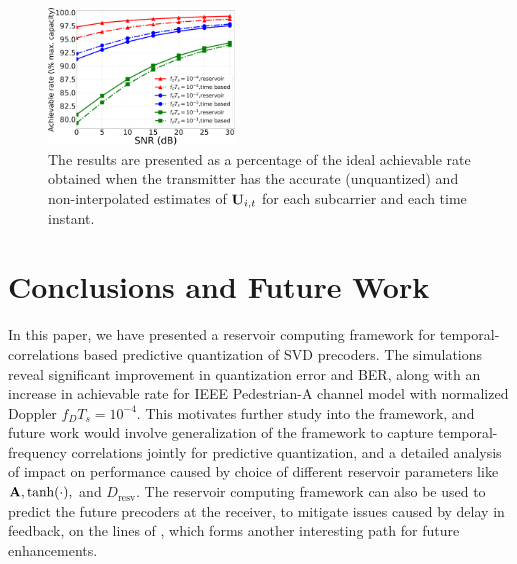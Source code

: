 \documentclass[conference]{IEEEtran}
\begin{document}
\begin{figure}[h]
\centering
\includegraphics[width=0.44\textwidth]{images/hopRate.pdf}
\caption{The results are presented as a percentage of the ideal achievable rate obtained when the transmitter has the accurate (unquantized) and non-interpolated estimates of ${\bf U}_{i,t}$ for each subcarrier and each time instant.}
\label{achievrate}
\vspace{-5pt}
\end{figure}
\section{Conclusions and Future Work}
\label{section5}
\vspace{-3pt}
In this paper, we have presented a reservoir computing framework for temporal-correlations based predictive quantization of SVD precoders.
The simulations reveal significant improvement in quantization error and BER, along with an increase in achievable rate for IEEE Pedestrian-A channel model with normalized Doppler $f_DT_s=10^{-4}$.
This motivates further study into the framework, and future work would involve generalization of the framework to capture temporal-frequency correlations jointly for predictive quantization, and a detailed analysis of impact on performance caused by choice of different reservoir parameters like ${\bf A},\text{tanh}(\cdot),$ and $D_{\text{resv}}$.
The reservoir computing framework can also be used to predict the future precoders at the receiver, to mitigate issues caused by delay in feedback, on the lines of \cite{chang2011adaptive}, which forms another interesting path for future enhancements.
\vspace{-5pt}



\renewcommand{\bibfont}{\footnotesize}


\end{document}
